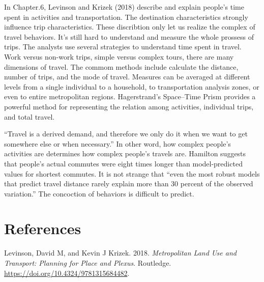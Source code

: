 \documentclass[12pt,]{article}
\begin{document}
In Chapter.6, Levinson and Krizek (2018) describe and explain people's
time spent in activities and transportation. The destination
characteristics strongly influence trip characteristics. These
discribtion only let us realize the complex of travel behaviors. It's
still hard to understand and measure the whole prossess of trips. The
analysts use several strategies to understand time spent in travel. Work
versus non-work trips, simple versus complex tours, there are many
dimensions of travel. The commom methods include calculate the distance,
number of trips, and the mode of travel. Measures can be averaged at
different levels from a single individual to a household, to
transportation analysis zones, or even to entire metropolitan regions.
Hagerstrand's Space--Time Prism provides a powerful method for
representing the relation among activities, individual trips, and total
travel.

``Travel is a derived demand, and therefore we only do it when we want
to get somewhere else or when necessary.'' In other word, how complex
people's activities are determines how complex people's travels are.
Hamilton suggests that people's actual commutes were eight times longer
than model-predicted values for shortest commutes. It is not strange
that ``even the most robust models that predict travel distance rarely
explain more than 30 percent of the observed variation.'' The concoction
of behaviors is difficult to predict.

\hypertarget{references}{%
\section*{References}\label{references}}

\hypertarget{refs}{}
\leavevmode\hypertarget{ref-levinson2018metropolitan}{}%
Levinson, David M, and Kevin J Krizek. 2018. \emph{Metropolitan Land Use
and Transport: Planning for Place and Plexus}. Routledge.
\url{https://doi.org/10.4324/9781315684482}.
\end{document}
